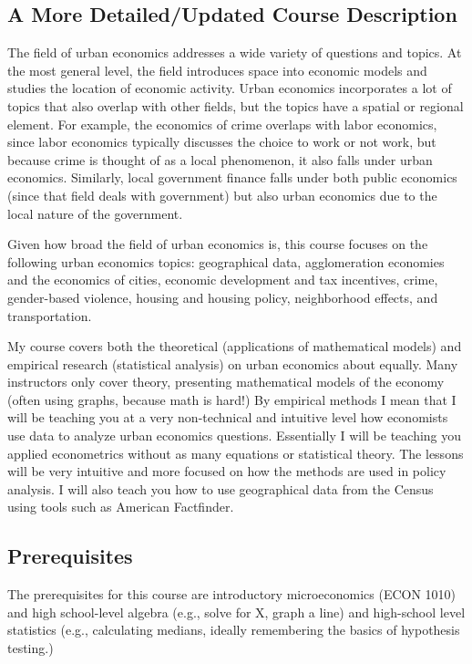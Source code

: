 \documentclass[11pt,letterpaper,final]{article}
\begin{document}
\subsection{A More Detailed/Updated Course Description}
The field of urban economics addresses a wide variety of questions and topics. At the most general level, the field introduces space into economic models and studies the location of economic activity. Urban economics incorporates a lot of topics that also overlap with other fields, but the topics have a spatial or regional element. For example, the economics of crime overlaps with labor economics, since labor economics typically discusses the choice to work or not work, but because crime is thought of as a local phenomenon, it also falls under urban economics. Similarly, local government finance falls under both public economics (since that field deals with government) but also urban economics due to the local nature of the government. 

Given how broad the field of urban economics is, this course focuses on the following urban economics topics: geographical data, agglomeration economies and the economics of cities, economic development and tax incentives, crime, gender-based violence, housing and housing policy, neighborhood effects, and transportation. 

My course covers both the theoretical (applications of mathematical models) and empirical research (statistical analysis) on urban economics about equally. Many instructors only cover theory, presenting mathematical models of the economy (often using graphs, because math is hard!) By empirical methods I mean that I will be teaching you at a very non-technical and intuitive level how economists use data to analyze urban economics questions. Essentially I will be teaching you applied econometrics without as many equations or statistical theory. The lessons will be very intuitive and more focused on how the methods are used in policy analysis. I will also teach you how to use geographical data from the Census using tools such as American Factfinder.

\subsection{Prerequisites}
The prerequisites for this course are introductory microeconomics (ECON 1010) and high school-level algebra (e.g., solve for X, graph a line) and high-school level statistics (e.g., calculating medians, ideally remembering the basics of hypothesis testing.) 
\end{document}
